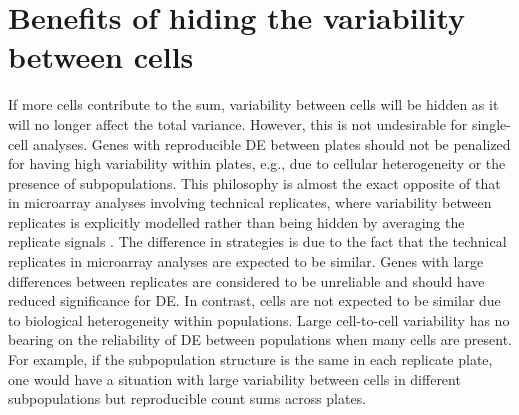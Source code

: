 \documentclass{article}
\newcommand\revised[1]{\textcolor{red}{#1}}
\begin{document}
\section{Benefits of hiding the variability between cells}
If more cells contribute to the sum, variability between cells will be hidden as it will no longer affect the total variance.
However, this is not undesirable for single-cell analyses.
Genes with reproducible DE between plates should not be penalized for having high variability within plates, e.g., due to cellular heterogeneity or the presence of subpopulations.
This philosophy is almost the exact opposite of that in microarray analyses involving technical replicates,
    where variability between replicates is explicitly modelled rather than being hidden by averaging the replicate signals \citep{smyth2005use}.
The difference in strategies is due to the fact that the technical replicates in microarray analyses are expected to be similar.
Genes with large differences between replicates are considered to be unreliable and should have reduced significance for DE.
In contrast, cells are not expected to be similar due to biological heterogeneity within populations.
Large cell-to-cell variability has no bearing on the reliability of DE between populations when many cells are present.
For example, if the subpopulation structure is the same in each replicate plate, one would have a situation with large variability between cells in different subpopulations but reproducible count sums across plates.

\end{document}
